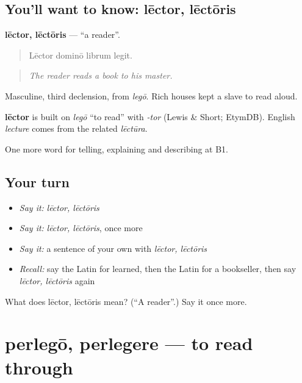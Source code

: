 \subsection*{You'll want to know: lēctor, lēctōris}
\textbf{lēctor, lēctōris} — \textquotedblleft{}a reader\textquotedblright{}.

\begin{quote}
Lēctor dominō librum legit.
\end{quote}

\begin{quote}
\emph{The reader reads a book to his master.}
\end{quote}

Masculine, third declension, from \emph{legō}. Rich houses kept a slave to read aloud.

\begin{cousinweb}
\textbf{lēctor} is built on \emph{legō} \textquotedblleft{}to read\textquotedblright{} with \emph{-tor} (Lewis \& Short; EtymDB). English \emph{lecture} comes from the related \emph{lēctūra}.
\end{cousinweb}

\begin{grammarlens}[title={What you've built}]
One more word for telling, explaining and describing at B1.
\end{grammarlens}

\subsection*{Your turn}
\begin{itemize}
\raggedright
  \item \emph{Say it:} \emph{lēctor, lēctōris}
  \item \emph{Say it:} \emph{lēctor, lēctōris}, once more
  \item \emph{Say it:} a sentence of your own with \emph{lēctor, lēctōris}
  \item \emph{Recall:} say the Latin for learned, then the Latin for a bookseller, then say \emph{lēctor, lēctōris} again
\end{itemize}

\begin{tcolorbox}[breakable,colback=teal!4,colframe=teal!35!black,title={Before you move on}]
What does lēctor, lēctōris mean? (\textquotedblleft{}A reader\textquotedblright{}.) Say it once more.
\end{tcolorbox}
\section[perlegō, perlegere]{perlegō, perlegere — to read through}

